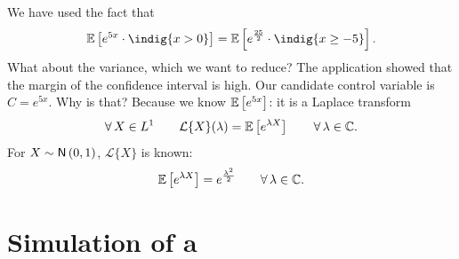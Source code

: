 \documentclass[12pt]{report}
\begin{document}
We have used the fact that 
\begin{equation*}
	\ev{e^{5x}\cdot\indig{x>0}}=\ev{e^{\frac{25}{2}}\cdot\indig{x\geq-5}}.
\end{equation*}
What about the variance, which we want to reduce? The application showed that the margin of the confidence interval is high. Our candidate control variable is $C=e^{5x}$. Why is that? Because we know $\mathbb{E}\left[e^{5x}\right]$: it is a Laplace transform
\begin{equation*}
	\forall\, X\in L^{1}\qquad\mathcal{L}\{X\}(\lambda)=\mathbb{E}\left[e^{\lambda X}\right]\qquad\forall\,\lambda\in\mathbb{C}.
\end{equation*}
For $X\sim\mathsf{N}\left(0,1\right)$, $\mathcal{L}\{X\}$ is known:
\begin{equation*}
	\mathbb{E}\left[e^{\lambda X}\right]=e^{\frac{\lambda^{2}}{2}}\qquad\forall\,\lambda\in\mathbb{C}.
\end{equation*}
\section{Simulation of a \bwm}
\end{document}
